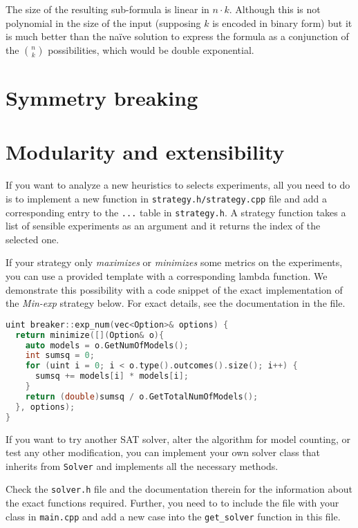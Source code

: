 The size of the resulting sub-formula is linear in $n\cdot k$.
Although this is not polynomial in the size of the input
  (supposing $k$ is encoded in binary form) but it is much better
  than the na\"ive solution to express the formula
  as a conjunction of the $n\choose k$ possibilities,
  which would be double exponential.

\section{Symmetry breaking}

\section{Modularity and extensibility}

If you want to analyze a new heuristics to selects experiments,
  all you need to do is to implement a new function
  in \texttt{strategy.h/strategy.cpp} file and add a corresponding entry
  to the \texttt{...} table in \texttt{strategy.h}.
A strategy function takes a list of sensible experiments as an argument
  and it returns the index of the selected one.

If your strategy only \emph{maximizes} or \emph{minimizes}
  some metrics on the experiments,
  you can use a provided template with a corresponding lambda function.
We demonstrate this possibility with a code snippet of
  the exact implementation of the \emph{Min-exp} strategy below.
For exact details, see the documentation in the file.

\begin{lstlisting}[language=C++]
uint breaker::exp_num(vec<Option>& options) {
  return minimize([](Option& o){
    auto models = o.GetNumOfModels();
    int sumsq = 0;
    for (uint i = 0; i < o.type().outcomes().size(); i++) {
      sumsq += models[i] * models[i];
    }
    return (double)sumsq / o.GetTotalNumOfModels();
  }, options);
}
\end{lstlisting}

If you want to try another SAT solver, alter the algorithm for model counting,
  or test any other modification,
  you can implement your own solver class that inherits from \texttt{Solver} and
  implements all the necessary methods.

Check the \texttt{solver.h} file and the documentation therein
  for the information about the exact functions required.
Further, you need to to include the file with your class in
  \texttt{main.cpp} and add a new case
  into the \texttt{get\_solver} function in this file.

